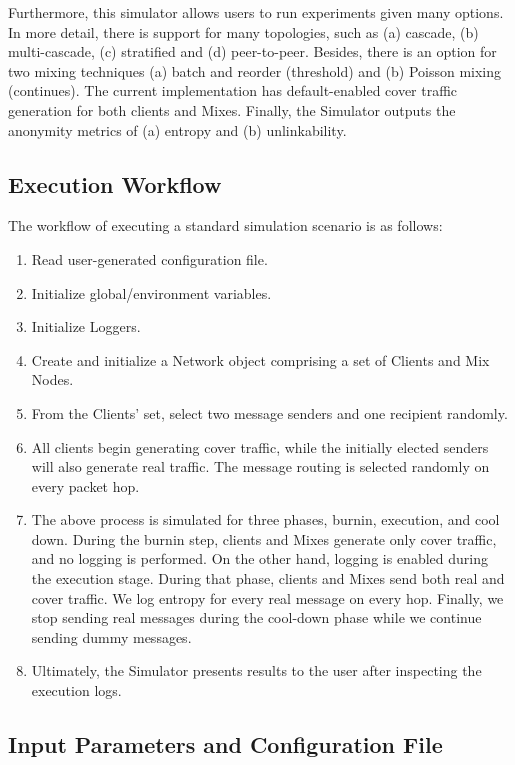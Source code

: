 \documentclass[logo,msc,cyber]{infthesis}   %
\begin{document}
Furthermore, this simulator allows users to run experiments given many options.
In more detail, there is support for many topologies, such as (a) cascade, (b)
multi-cascade, (c) stratified and (d) peer-to-peer. Besides, there is an option
for two mixing techniques (a) batch and reorder (threshold) and (b) Poisson
mixing (continues). The current implementation has default-enabled cover traffic
generation for both clients and Mixes. Finally, the Simulator outputs the
anonymity metrics of (a) entropy and (b) unlinkability.

\subsection{Execution Workflow}

The workflow of executing a standard simulation scenario is as follows:

\begin{enumerate}
    \item Read user-generated configuration file.
    \item Initialize global/environment variables.
    \item Initialize Loggers.
    \item Create and initialize a Network object comprising a set of Clients and Mix Nodes.
    \item From the Clients' set, select two message senders and one recipient randomly.
    \item All clients begin generating cover traffic, while the initially
    elected senders will also generate real traffic. The message routing is
    selected randomly on every packet hop.
    \item The above process is simulated for three phases, burnin, execution,
    and cool down. During the burnin step, clients and Mixes generate only cover
    traffic, and no logging is performed. On the other hand, logging is enabled
    during the execution stage. During that phase, clients and Mixes send both
    real and cover traffic. We log entropy for every real message on every hop.
    Finally, we stop sending real messages during the cool-down phase while we
    continue sending dummy messages.
    \item Ultimately, the Simulator presents results to the user after
    inspecting the execution logs.
\end{enumerate}

\subsection{Input Parameters and Configuration File}
\end{document}
